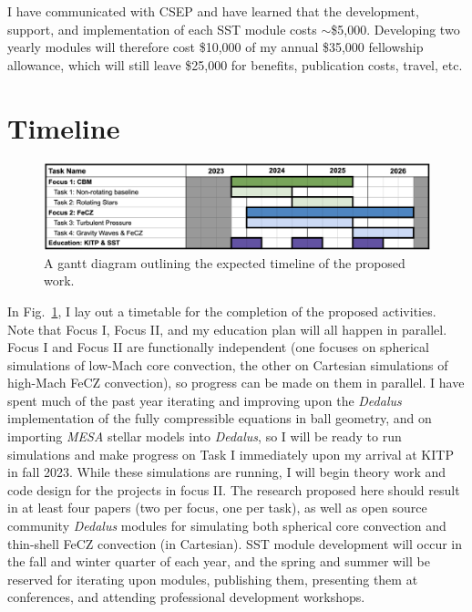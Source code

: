 \documentclass[11pt]{amsart} %
\theoremstyle{definition}
\numberwithin{equation}{section}
\begin{document}
I have communicated with CSEP and have learned that the development, support, and implementation of each SST module costs $\sim$\$5,000.
Developing two yearly modules will therefore cost \$10,000 of my annual \$35,000 fellowship allowance, which will still leave \$25,000 for benefits, publication costs, travel, etc.



\section{Timeline}

\begin{figure}[t!]
     \centering
     \captionsetup{width=0.97\linewidth}
     \includegraphics[width=\textwidth]{figures/gantt.png}
        \caption{A gantt diagram outlining the expected timeline of the proposed work. 
        \label{fig:gantt}}
\end{figure}

In Fig.~\ref{fig:gantt}, I lay out a timetable for the completion of the proposed activities.
Note that Focus I, Focus II, and my education plan will all happen in parallel.
Focus I and Focus II are functionally independent (one focuses on spherical simulations of low-Mach core convection, the other on Cartesian simulations of high-Mach FeCZ convection), so progress can be made on them in parallel.
I have spent much of the past year iterating and improving upon the \emph{Dedalus} implementation of the fully compressible equations in ball geometry, and on importing \emph{MESA} stellar models into \emph{Dedalus}, so I will be ready to run simulations and make progress on Task I immediately upon my arrival at KITP in fall 2023.
While these simulations are running, I will begin theory work and code design for the projects in focus II.
The research proposed here should result in at least four papers (two per focus, one per task), as well as open source community \emph{Dedalus} modules for simulating both spherical core convection and thin-shell FeCZ convection (in Cartesian).
SST module development will occur in the fall and winter quarter of each year, and the spring and summer will be reserved for iterating upon modules, publishing them, presenting them at conferences, and attending professional development workshops.
\end{document}
